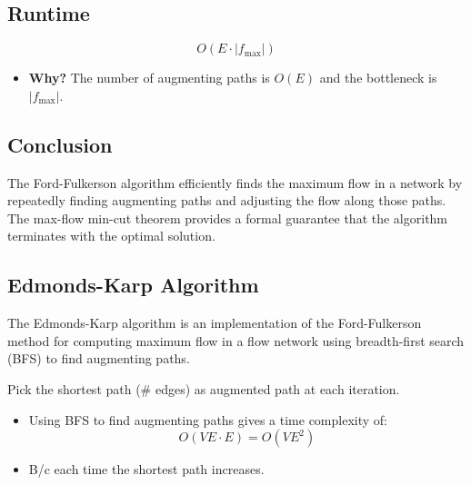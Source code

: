 \subsection{Runtime}
\begin{definition}
    \begin{equation*}
        O(E \cdot |f_{\max}|)
    \end{equation*}
    \begin{itemize}
        \item \textbf{Why?} The number of augmenting paths is $O(E)$ and the bottleneck is $|f_{\max}|$.
    \end{itemize}
\end{definition}
\begin{derivation}
\end{derivation}

\subsection{Conclusion}
\begin{summary}
    The Ford-Fulkerson algorithm efficiently finds the maximum flow in a network by repeatedly finding augmenting paths and adjusting the flow along those paths. The max-flow min-cut theorem provides a formal guarantee that the algorithm terminates with the optimal solution.
\end{summary}

\subsection{Edmonds-Karp Algorithm}
\begin{algo}
    The Edmonds-Karp algorithm is an implementation of the Ford-Fulkerson method for computing maximum flow in a flow network using breadth-first search (BFS) to find augmenting paths.
    \vspace{1em}

    Pick the shortest path (\# edges) as augmented path at each iteration.
    \begin{itemize}
        \item Using BFS to find augmenting paths gives a time complexity of:
        \[
        O(VE \cdot E) = O(V E^2)
        \]
        \item B/c each time the shortest path increases. 
    \end{itemize}
\end{algo}

